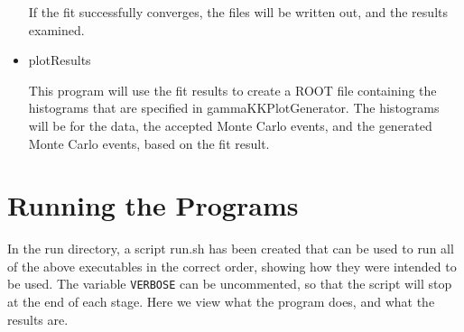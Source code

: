 \documentclass[11pt]{article}
\begin{document}
\begin{itemize}
    If the fit successfully converges, the files will be written out,
    and the results examined.

  \item plotResults

    This program will use the fit results to create a ROOT file
    containing the histograms that are specified in
    gammaKKPlotGenerator. The histograms will be for the data, the
    accepted Monte Carlo events, and the generated Monte Carlo events,
    based on the fit result.

\end{itemize}

\section{Running the Programs}

In the run directory, a script run.sh has been created that can be
used to run all of the above executables in the correct order, showing
how they were intended to be used. The variable {\tt{VERBOSE}} can be
uncommented, so that the script will stop at the end of each stage.
Here we view what the program does, and what the results are.
\end{document}
